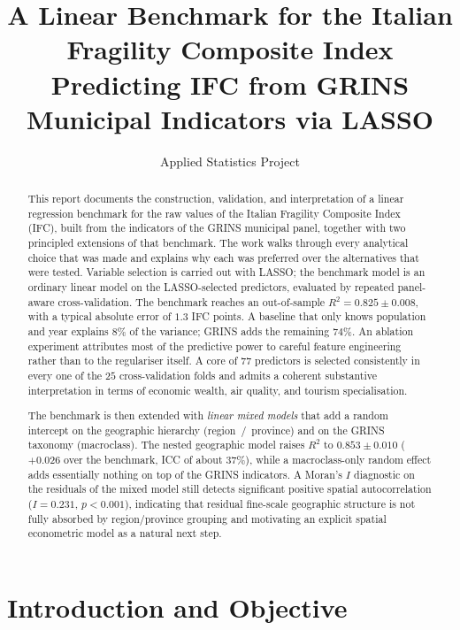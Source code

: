\documentclass[11pt,a4paper]{article}
\title{A Linear Benchmark for the Italian Fragility Composite Index\\[0.3em]
  \large Predicting IFC from GRINS Municipal Indicators via LASSO}
\author{Applied Statistics Project}
\date{}
\begin{document}
\maketitle

\begin{abstract}
\noindent
This report documents the construction, validation, and interpretation
of a linear regression benchmark for the raw values of the Italian
Fragility Composite Index (IFC), built from the indicators of the GRINS
municipal panel, together with two principled extensions of that
benchmark. The work walks through every analytical choice that was
made and explains why each was preferred over the alternatives that
were tested. Variable selection is carried out with LASSO; the
benchmark model is an ordinary linear model on the LASSO-selected
predictors, evaluated by repeated panel-aware cross-validation. The
benchmark reaches an out-of-sample \(R^{2} = 0.825 \pm 0.008\), with a
typical absolute error of \(1.3\) IFC points. A baseline that only
knows population and year explains \(8\%\) of the variance; GRINS adds
the remaining \(74\%\). An ablation experiment attributes most of the
predictive power to careful feature engineering rather than to the
regulariser itself. A core of \(77\) predictors is selected
consistently in every one of the \(25\) cross-validation folds and
admits a coherent substantive interpretation in terms of economic
wealth, air quality, and tourism specialisation.

The benchmark is then extended with \emph{linear mixed models} that
add a random intercept on the geographic hierarchy
(region~/~province) and on the GRINS taxonomy (macroclass). The
nested geographic model raises \(R^{2}\) to \(0.853 \pm 0.010\)
(\(+0.026\) over the benchmark, ICC of about \(37\%\)), while a
macroclass-only random effect adds essentially nothing on top of the
GRINS indicators. A Moran's \(I\) diagnostic on the residuals of the
mixed model still detects significant positive spatial autocorrelation
(\(I = 0.231\), \(p < 0.001\)), indicating that residual fine-scale
geographic structure is not fully absorbed by region/province grouping
and motivating an explicit spatial econometric model as a natural
next step.
\end{abstract}

\tableofcontents
\vspace{1em}

\section{Introduction and Objective}
\label{sec:intro}
\end{document}
